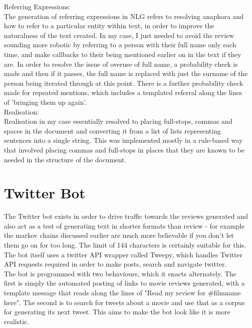Referring Expressions:\\
The generation of referring expressions in NLG refers to resolving anaphora and how to refer to a particular entity within text, in order to improve the naturalness of the text created. In my case, I just needed to avoid the review sounding more robotic by referring to a person with their full name only each time, and make callbacks to their being mentioned earlier on in the text if they are. In order to resolve the issue of overuse of full name, a probability check is made and then if it passes, the full name is replaced with just the surname of the person being iterated through at this point. There is a further probability check made for repeated mentions, which includes a templated referral along the lines of 'bringing them up again'.\\



Realisation:\\
Realisation in my case essentially resolved to placing full-stops, commas and spaces in the document and converting it from a list of lists representing sentences into a single string. This was implemented mostly in a rule-based way that involved placing commas and full-stops in places that they are known to be needed in the structure of the document.\\


\section{Twitter Bot}
The Twitter bot exists in order to drive traffic towards the reviews generated and also act as a test of generating text in shorter formats than review - for example the markov chains discussed earlier are much more believable if you don't let them go on for too long. The limit of 144 characters is certainly suitable for this.\\
The bot itself uses a twitter API wrapper called Tweepy, which handles Twitter API requests required in order to make posts, search and navigate twitter.\\
The bot is programmed with two behaviours, which it enacts alternately. The first is simply the automated posting of links to movie reviews generated, with a template message that reads along the lines of "Read my review for \#filmname here". The second is to search for tweets about a movie and use that as a corpus for generating its next tweet. This aims to make the bot look like it is more realistic.\\



